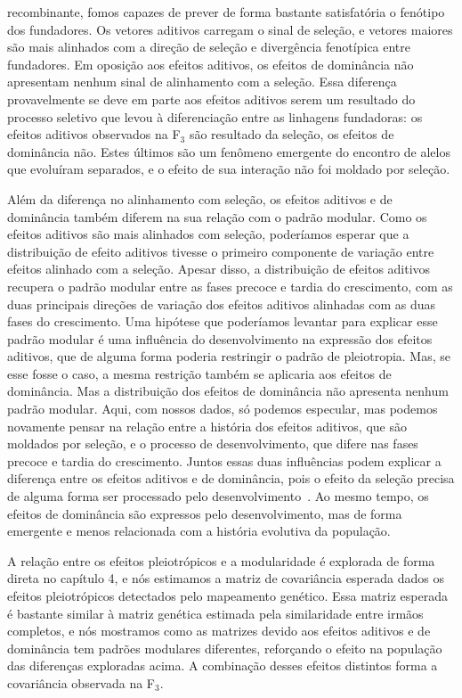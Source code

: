 \begin{refsection}
recombinante, fomos capazes de prever de forma bastante satisfatória o
fenótipo dos fundadores. Os vetores aditivos carregam o sinal de seleção, e
vetores maiores são mais alinhados com a direção de seleção e divergência
fenotípica entre fundadores.  Em oposição aos efeitos aditivos, os efeitos de
dominância não apresentam nenhum sinal de alinhamento com a seleção. Essa
diferença provavelmente se deve em parte aos efeitos aditivos serem um
resultado do processo seletivo que levou à diferenciação entre as linhagens
fundadoras: os efeitos aditivos observados na F$_3$ são resultado da seleção,
os efeitos de dominância não. Estes últimos são um fenômeno emergente do
encontro de alelos que evoluíram separados, e o efeito de sua interação não
foi moldado por seleção.

Além da diferença no alinhamento com seleção, os efeitos aditivos e de
dominância também diferem na sua relação com o padrão modular. Como os efeitos
aditivos são mais alinhados com seleção, poderíamos esperar que a distribuição
de efeito aditivos tivesse o primeiro componente de variação entre efeitos
alinhado com a seleção. Apesar disso, a distribuição de efeitos aditivos
recupera o padrão modular entre as fases precoce e tardia do crescimento, com
as duas principais direções de variação dos efeitos aditivos alinhadas com as
duas fases do crescimento. Uma hipótese que poderíamos levantar para explicar
esse padrão modular é uma influência do desenvolvimento na expressão dos
efeitos aditivos, que de alguma forma poderia restringir o padrão de
pleiotropia. Mas, se esse fosse o caso, a mesma restrição também se aplicaria
aos efeitos de dominância. Mas a distribuição dos efeitos de dominância não
apresenta nenhum padrão modular. Aqui, com nossos dados, só podemos especular,
mas podemos novamente pensar na relação entre a história dos efeitos aditivos,
que são moldados por seleção, e o processo de desenvolvimento, que difere nas
fases precoce e tardia do crescimento. Juntos essas duas influências podem
explicar a diferença entre os efeitos aditivos e de dominância, pois o efeito
da seleção precisa de alguma forma ser processado pelo
desenvolvimento~\parencite{Klingenberg2008-ll}. Ao mesmo tempo, os efeitos de
dominância são expressos pelo desenvolvimento, mas de forma emergente e menos
relacionada com a história evolutiva da população.

A relação entre os efeitos pleiotrópicos e a modularidade é explorada de forma
direta no capítulo 4, e nós estimamos a matriz de covariância esperada dados
os efeitos pleiotrópicos detectados pelo mapeamento genético. Essa
matriz esperada é bastante similar à matriz genética estimada pela
similaridade entre irmãos completos, e nós mostramos como as matrizes devido
aos efeitos aditivos e de dominância tem padrões modulares diferentes,
reforçando o efeito na população das diferenças exploradas acima. A combinação
desses efeitos distintos forma a covariância observada na F$_3$.


\end{refsection}
